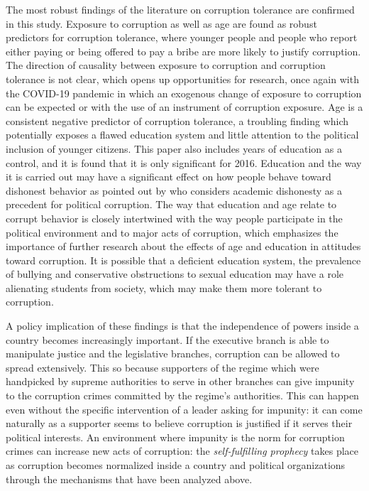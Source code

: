 \documentclass[floatsintext,man]{apa7}\usepackage[]{graphicx}\usepackage[]{color}
\begin{document}
The most robust findings of the literature on corruption tolerance are confirmed in this study. Exposure to corruption as well as age are found as robust predictors for corruption tolerance, where younger people and people who report either paying or being offered to pay a bribe are more likely to justify corruption. The direction of causality between exposure to corruption and corruption tolerance is not clear, which opens up opportunities for research, once again with the COVID-19 pandemic in which an exogenous change of exposure to corruption can be expected \parencite{RoaChejin.2020} or with the use of an instrument of corruption exposure. Age is a consistent negative predictor of corruption tolerance, a troubling finding which potentially exposes a flawed education system and little attention to the political inclusion of younger citizens. This paper also includes years of education as a control, and it is found that it is only significant for 2016. Education and the way it is carried out may have a significant effect on how people behave toward dishonest behavior as pointed out by \textcite{Adoum.2000} who considers academic dishonesty as a precedent for political corruption. The way that education and age relate to corrupt behavior is closely intertwined with the way people participate in the political environment and to major acts of corruption, which emphasizes the importance of further research about the effects of age and education in attitudes toward corruption. It is possible that a deficient education system, the prevalence of bullying and conservative obstructions to sexual education may have a role alienating students from society, which may make them more tolerant to corruption.

A policy implication of these findings is that the independence of powers inside a country becomes increasingly important. If the executive branch is able to manipulate justice and the legislative branches, corruption can be allowed to spread extensively. This so because supporters of the regime which were handpicked by supreme authorities to serve in other branches can give impunity to the corruption crimes committed by the regime's authorities. This can happen even without the specific intervention of a leader asking for impunity: it can come naturally as a supporter seems to believe corruption is justified if it serves their political interests. An environment where impunity is the norm for corruption crimes can increase new acts of corruption: the \textit{self-fulfilling prophecy} takes place as corruption becomes normalized inside a country and political organizations through the mechanisms that have been analyzed above. 
\end{document}
